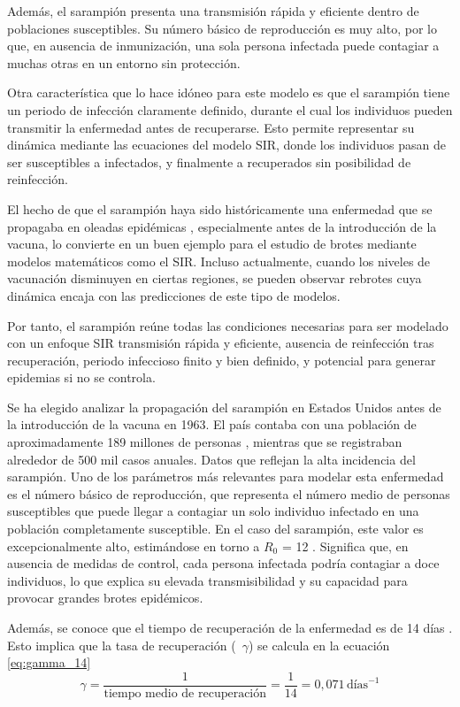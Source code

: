 Además, el sarampión presenta una transmisión rápida y eficiente dentro de poblaciones susceptibles. Su número básico de reproducción es muy alto, por lo que, en ausencia de inmunización, una sola persona infectada puede contagiar a muchas otras en un entorno sin protección.

Otra característica que lo hace idóneo para este modelo es que el sarampión tiene un periodo de infección claramente definido, durante el cual los individuos pueden transmitir la enfermedad antes de recuperarse. Esto permite representar su dinámica mediante las ecuaciones del modelo SIR, donde los individuos pasan de ser susceptibles a infectados, y finalmente a recuperados sin posibilidad de reinfección.

El hecho de que el sarampión haya sido históricamente una enfermedad que se propagaba en oleadas epidémicas , especialmente antes de la introducción de la vacuna, lo convierte en un buen ejemplo para el estudio de brotes mediante modelos matemáticos como el SIR. Incluso actualmente, cuando los niveles de vacunación disminuyen en ciertas regiones, se pueden observar rebrotes cuya dinámica encaja con las predicciones de este tipo de modelos.

Por tanto, el sarampión reúne todas las condiciones necesarias para ser modelado con un enfoque SIR transmisión rápida y eficiente, ausencia de reinfección tras recuperación, periodo infeccioso finito y bien definido, y potencial para generar epidemias si no se controla. 

Se ha elegido analizar la propagación del sarampión en Estados Unidos antes de la introducción de la vacuna en 1963. El país contaba con una población de aproximadamente 189 millones de personas \cite{datosmacro_usa_1963}, mientras que se registraban alrededor de 500 mil casos anuales. Datos que reflejan la alta incidencia del sarampión.
Uno de los parámetros más relevantes para modelar esta enfermedad es el número básico de reproducción, que representa el número medio de personas susceptibles que puede llegar a contagiar un solo individuo infectado en una población completamente susceptible. En el caso del sarampión, este valor es excepcionalmente alto, estimándose en torno a $R_0$ = 12 \cite{solomon2019peter}. Significa que, en ausencia de medidas de control, cada persona infectada podría contagiar a doce individuos, lo que explica su elevada transmisibilidad y su capacidad para provocar grandes brotes epidémicos.

Además, se conoce que el tiempo de recuperación de la enfermedad es de 14 días \cite{ops_sarampion}. Esto implica que la tasa de recuperación (~$\gamma$) se calcula en la ecuación \eqref{eq:gamma_14}
\begin{equation}
\gamma = \frac{1}{\text{tiempo medio de recuperación}} = \frac{1}{14} = 0{,}071 \,\text{días}^{-1}
\label{eq:gamma_14}
\end{equation}

